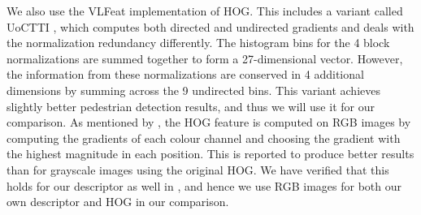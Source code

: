 \documentclass[thesis.tex]{subfiles}
\begin{document}
We also use the VLFeat implementation of HOG. This includes a variant called UoCTTI \cite{felzenszwalb2009object}, which computes both directed and undirected gradients and deals with the normalization redundancy differently. The histogram bins for the 4 block normalizations are summed together to form a 27-dimensional vector. However, the information from these normalizations are conserved in 4 additional dimensions by summing across the 9 undirected bins. This variant achieves slightly better pedestrian detection results, and thus we will use it for our comparison. As mentioned by \citet{dalal2005histograms}, the HOG feature is computed on RGB images by computing the gradients of each colour channel and choosing the gradient with the highest magnitude in each position. This is reported to produce better results than for grayscale images using the original HOG. We have verified that this holds for our descriptor as well in , and hence we use RGB images for both our own descriptor and HOG in our comparison.
%
%
\end{document}
